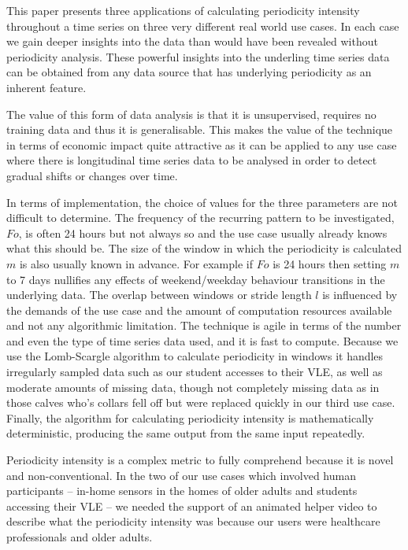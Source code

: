 \documentclass[preprints,article,accept,pdftex,moreauthors]{Definitions/mdpi}
\begin{document}
{This paper presents three applications of   calculating  periodicity intensity throughout a time series {on} three {very} different real world use cases. In each case we gain deeper insights into the data than would have been revealed without periodicity analysis. These powerful insights into {the underling} time series data can be obtained from any data source that has {underlying} periodicity {as an inherent feature}.

The value of this form of data analysis is that it is unsupervised, requires no training data  and thus it is generalisable.  {This makes the value of the technique in terms of economic impact quite attractive as it can be applied to any use case where there is longitudinal time series data to be analysed in order to detect gradual shifts or changes over time.}

{In terms of implementation, the choice of values for the three parameters are not difficult to determine.} 
The frequency of the recurring pattern to be investigated, $Fo$, is often 24 hours but not always so and the use case usually already knows what this should be. The size of the window in which the periodicity is calculated $m$ is also usually known in advance. For example if $Fo$ is 24 hours then setting $m$ to 7 days nullifies any effects of weekend/weekday behaviour transitions in the underlying data. The overlap between windows or stride {length} $l$ is influenced by the demands of the use case and the amount of computation resources available and not any algorithmic limitation. The technique is agile in terms of the number and even the type of time series data used, and it is fast to compute.  Because we use the Lomb-Scargle algorithm \cite{VanderPlas_2018} to calculate periodicity in windows it handles irregularly sampled data such as our student accesses to their VLE, as well as moderate amounts of missing data, {though} not completely missing data as in those calves who's collars fell off but were replaced quickly in our third use case.  {Finally, the algorithm for calculating periodicity intensity is mathematically deterministic, producing the same output from the same input repeatedly.}
 
Periodicity intensity is a complex metric to fully comprehend because it is novel and non-conventional. In the two of our use cases which involved human participants -- in-home sensors in the homes of older adults and students accessing their VLE -- we needed the support of an animated helper video to describe what the periodicity intensity was because our users were healthcare professionals and older adults.

}
\end{document}
